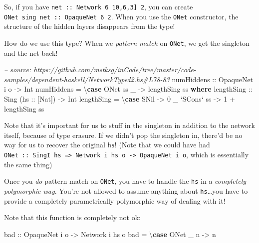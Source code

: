 \documentclass[]{article}
\newenvironment{Shaded}{}{}
\newcommand{\KeywordTok}[1]{\textcolor[rgb]{0.00,0.44,0.13}{\textbf{{#1}}}}
\newcommand{\DataTypeTok}[1]{\textcolor[rgb]{0.56,0.13,0.00}{{#1}}}
\newcommand{\DecValTok}[1]{\textcolor[rgb]{0.25,0.63,0.44}{{#1}}}
\newcommand{\CommentTok}[1]{\textcolor[rgb]{0.38,0.63,0.69}{\textit{{#1}}}}
\newcommand{\OtherTok}[1]{\textcolor[rgb]{0.00,0.44,0.13}{{#1}}}
\newcommand{\FunctionTok}[1]{\textcolor[rgb]{0.02,0.16,0.49}{{#1}}}
\newcommand{\NormalTok}[1]{{#1}}
\begin{document}
So, if you have \texttt{net\ ::\ Network\ 6\ \textquotesingle{}{[}10,6,3{]}\ 2},
you can create \texttt{ONet\ sing\ net\ ::\ OpaqueNet\ 6\ 2}. When you use the
\texttt{ONet} constructor, the structure of the hidden layers disappears from
the type!

How do we use this type? When we \emph{pattern match} on \texttt{ONet}, we get
the singleton and the net back!

\begin{Shaded}
\begin{Highlighting}[]
\CommentTok{-- source: https://github.com/mstksg/inCode/tree/master/code-samples/dependent-haskell/NetworkTyped2.hs#L78-83}
\OtherTok{numHiddens ::} \DataTypeTok{OpaqueNet} \NormalTok{i o }\OtherTok{->} \DataTypeTok{Int}
\NormalTok{numHiddens }\FunctionTok{=} \NormalTok{\textbackslash{}}\KeywordTok{case} \DataTypeTok{ONet} \NormalTok{ss _ }\OtherTok{->} \NormalTok{lengthSing ss}
  \KeywordTok{where}
\OtherTok{    lengthSing ::} \DataTypeTok{Sing} \NormalTok{(}\OtherTok{hs ::} \NormalTok{[}\DataTypeTok{Nat}\NormalTok{]) }\OtherTok{->} \DataTypeTok{Int}
    \NormalTok{lengthSing }\FunctionTok{=} \NormalTok{\textbackslash{}}\KeywordTok{case} \DataTypeTok{SNil}         \OtherTok{->} \DecValTok{0}
                       \NormalTok{_ }\OtherTok{`SCons`} \NormalTok{ss }\OtherTok{->} \DecValTok{1} \FunctionTok{+} \NormalTok{lengthSing ss}
\end{Highlighting}
\end{Shaded}

Note that it's important for us to stuff in the singleton in addition to the
network itself, because of type erasure. If we didn't pop the singleton in,
there'd be no way for us to recover the original \texttt{hs}! (Note that we
could have had
\texttt{ONet\ ::\ SingI\ hs\ =\textgreater{}\ Network\ i\ hs\ o\ -\textgreater{}\ OpaqueNet\ i\ o},
which is essentially the same thing)

Once you \emph{do} pattern match on \texttt{ONet}, you have to handle the
\texttt{hs} in a \emph{completely polymorphic way}. You're not allowed to assume
anything about \texttt{hs}\ldots{}you have to provide a completely
parametrically polymorphic way of dealing with it!

Note that this function is completely not ok:

\begin{Shaded}
\begin{Highlighting}[]
\OtherTok{bad ::} \DataTypeTok{OpaqueNet} \NormalTok{i o }\OtherTok{->} \DataTypeTok{Network} \NormalTok{i hs o}
\NormalTok{bad }\FunctionTok{=} \NormalTok{\textbackslash{}}\KeywordTok{case} \DataTypeTok{ONet} \NormalTok{_ n }\OtherTok{->} \NormalTok{n}
\end{Highlighting}
\end{Shaded}
\end{document}

